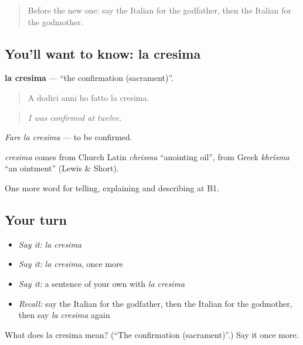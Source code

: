\label{lesson:IT-C308-cresima}



\begin{quote}
Before the new one: say the Italian for the godfather, then the Italian for the godmother.
\end{quote}

\subsection*{You'll want to know: la cresima}
\textbf{la cresima} — \textquotedblleft{}the confirmation (sacrament)\textquotedblright{}.

\begin{quote}
A dodici anni ho fatto la cresima.
\end{quote}

\begin{quote}
\emph{I was confirmed at twelve.}
\end{quote}

\emph{Fare la cresima} — to be confirmed.

\begin{cousinweb}
\emph{cresima} comes from Church Latin \emph{chrisma} \textquotedblleft{}anointing oil\textquotedblright{}, from Greek \emph{khrîsma} \textquotedblleft{}an ointment\textquotedblright{} (Lewis \& Short).
\end{cousinweb}

\begin{grammarlens}[title={What you've built}]
One more word for telling, explaining and describing at B1.
\end{grammarlens}

\subsection*{Your turn}
\begin{itemize}
\raggedright
  \item \emph{Say it:} \emph{la cresima}
  \item \emph{Say it:} \emph{la cresima}, once more
  \item \emph{Say it:} a sentence of your own with \emph{la cresima}
  \item \emph{Recall:} say the Italian for the godfather, then the Italian for the godmother, then say \emph{la cresima} again
\end{itemize}

\begin{tcolorbox}[breakable,colback=teal!4,colframe=teal!35!black,title={Before you move on}]
What does la cresima mean? (\textquotedblleft{}The confirmation (sacrament)\textquotedblright{}.) Say it once more.
\end{tcolorbox}
